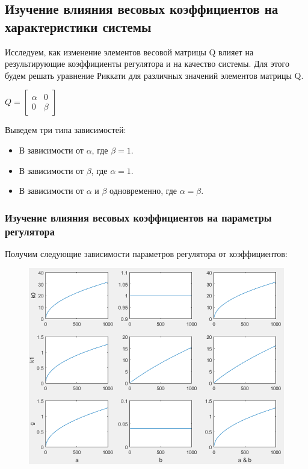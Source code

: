 \documentclass[14pt,a4paper,report]{report}
\begin{document}
\clearpage

\subsection{Изучение влияния весовых коэффициентов на характеристики системы}

Исследуем, как изменение элементов весовой матрицы Q влияет на результирующие коэффициенты регулятора и на качество системы. Для этого будем решать уравнение Риккати для различных значений элементов матрицы Q.

\begin{center}
	$Q=\begin{bmatrix} \alpha & 0 \\
	0 & \beta \end{bmatrix} $
\end{center}
	
Выведем три типа зависимостей:

\begin{itemize}
	\item В зависимости от $\alpha$, где $\beta=1$.
	\item В зависимости от $\beta$, где $\alpha=1$.
	\item В зависимости от $\alpha$ и $\beta$ одновременно, где $\alpha=\beta$.
\end{itemize}

\subsubsection{Изучение влияния весовых коэффициентов на параметры регулятора}

Получим следующие зависимости параметров регулятора от коэффициентов:

\begin{figure}[h!]
	\centering
	\includegraphics[scale = 0.85]{images/1.png}
	\label{image:3}
\end{figure}
\end{document}
